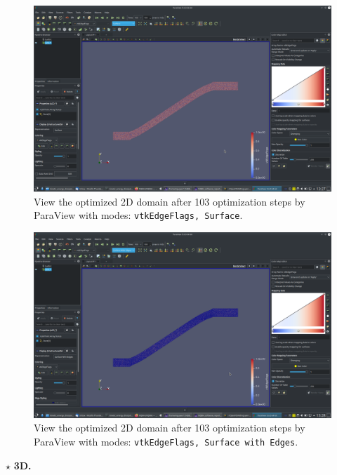 \documentclass[onsided]{book}
\numberwithin{equation}{section}
\begin{document}
\begin{enumerate}
\begin{enumerate}
        \begin{figure}[H]
            \centering
            \includegraphics[height=0.44\textheight]{optimized_domain_2D_after_103_steps_vtkEdgeFlags_Surface}
            \caption{View the optimized 2D domain after 103 optimization steps by ParaView with modes: \texttt{vtkEdgeFlags, Surface}.}
        \end{figure}
        
        \begin{figure}[H]
            \centering
            \includegraphics[height=0.44\textheight]{optimized_domain_2D_after_103_steps_vtkEdgeFlags_Surface_with_Edges}
            \caption{View the optimized 2D domain after 103 optimization steps by ParaView with modes: \texttt{vtkEdgeFlags, Surface with Edges}.}
        \end{figure}

        $\star$ \textbf{3D.}
        

\end{enumerate}
\end{enumerate}
\end{document}
